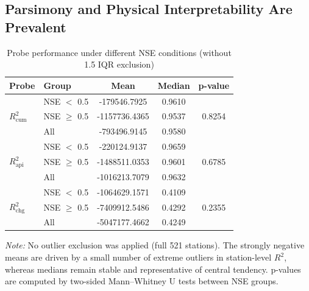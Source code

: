 \documentclass[11pt]{article}
\begin{document}
\subsection{Parsimony and Physical Interpretability Are Prevalent}
\label{sec:parsimony}
\begin{table}[htbp]
    \centering
    \caption{Probe performance under different NSE conditions (without 1.5 IQR exclusion)}
    \begin{tabular*}{\textwidth}{@{\extracolsep{\fill}}llccc}
        \toprule
        Probe & Group & Mean & Median & p-value \\
        \midrule

        \multirow{3}{*}{$R^2_{\mathrm{cum}}$}
        & NSE $<$ 0.5    & -179546.7925 & 0.9610 & \multirow{3}{*}{0.8254} \\
        & NSE $\geq$ 0.5 & -1157736.4365 & 0.9537 & \\
        & All            & -793496.9145 & 0.9580 & \\

        \midrule

        \multirow{3}{*}{$R^2_{\mathrm{api}}$}
        & NSE $<$ 0.5    & -220124.9137 & 0.9659 & \multirow{3}{*}{0.6785} \\
        & NSE $\geq$ 0.5 & -1488511.0353 & 0.9601 & \\
        & All            & -1016213.7079 & 0.9632 & \\

        \midrule

        \multirow{3}{*}{$R^2_{\mathrm{chg}}$}
        & NSE $<$ 0.5    & -1064629.1571 & 0.4109 & \multirow{3}{*}{0.2355} \\
        & NSE $\geq$ 0.5 & -7409912.5486 & 0.4292 & \\
        & All            & -5047177.4662 & 0.4249 & \\

        \bottomrule
    \end{tabular*}

    \vspace{3pt}
    \begin{minipage}{\textwidth}
        \footnotesize
        \textit{Note:} No outlier exclusion was applied (full 521 stations). The strongly negative means are driven by a small number of extreme outliers in station-level $R^2$, whereas medians remain stable and representative of central tendency. p-values are computed by two-sided Mann--Whitney U tests between NSE groups.
    \end{minipage}
    \label{tab:probe_no_iqr_si}
\end{table}
\end{document}
